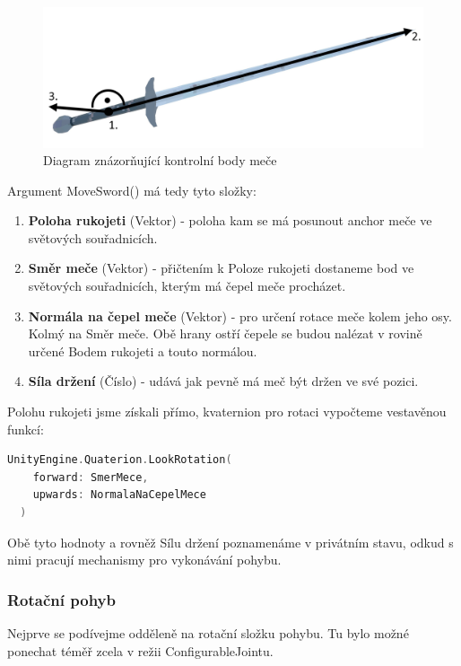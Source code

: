 \begin{figure}[ht]\centering
  \center
  \includegraphics[width=140mm]{../img/diagram-swordPositioning.png}
  \caption{Diagram znázorňující kontrolní body meče}
  \label{obr05:swordPositioningDiagram}
\end{figure} 

Argument MoveSword() má tedy tyto složky:
\begin{enumerate}
    \item \textbf{Poloha rukojeti} (Vektor) - poloha kam se má posunout anchor meče ve světových souřadnicích.
    \item \textbf{Směr meče} (Vektor) - přičtením k Poloze rukojeti dostaneme bod ve světových souřadnicích, kterým má čepel meče procházet.
    \item \textbf{Normála na čepel meče} (Vektor) - pro určení rotace meče kolem jeho osy. Kolmý na Směr meče. Obě hrany ostří čepele se budou nalézat v rovině určené Bodem rukojeti a touto normálou.   
    \item \textbf{Síla držení} (Číslo) - udává jak pevně má meč být držen ve své pozici.
\end{enumerate}

Polohu rukojeti jsme získali přímo, kvaternion pro rotaci vypočteme vestavěnou funkcí:

\begin{lstlisting}[language=C, basicstyle=\fontsize{11}{13}\selectfont\ttfamily]
  UnityEngine.Quaterion.LookRotation(
    forward: SmerMece,
    upwards: NormalaNaCepelMece
  )
\end{lstlisting}

Obě tyto hodnoty a rovněž Sílu držení poznamenáme v privátním stavu, odkud s nimi pracují mechanismy pro vykonávání pohybu.

\subsubsection*{Rotační pohyb}

Nejprve se podívejme odděleně na rotační složku pohybu. Tu bylo možné ponechat téměř zcela v režii ConfigurableJointu.


